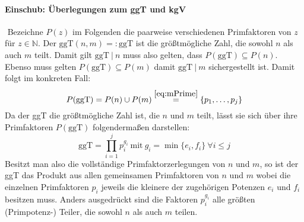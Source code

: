 \documentclass[DIN, pagenumber=false, fontsize=11pt, parskip=half]{scrartcl}
\newcommand{\N}[0]{\mathbb{N}}
\newcommand{\ggt}{\text{ggT}}
\begin{document}
\begin{enumerate}[label=\alph*)]
        \paragraph{Einschub: Überlegungen zum ggT und kgV} \label{par:Einschub} $ $ \newline
        Bezeichne $P(z)$ im Folgenden die paarweise verschiedenen Primfaktoren von $z$ für $z \in \N$. Der $\ggt(n,m) =: \ggt$ ist die größtmögliche Zahl, 
        die sowohl $n$ als auch $m$ teilt. Damit gilt $\ggt \ | \ n$ muss also gelten, dass $P(\ggt) \subseteq P(n)$. Ebenso muss gelten $P(\ggt) \subseteq P(m)$
        damit $\ggt \ | \ m$ sichergestellt ist. Damit folgt im konkreten Fall:
        \begin{equation}
            P(\ggt) = P(n) \cup P(m) \stackrel{\ref{eq:mPrime}}{=} \{p_1, \dots, p_j\} \label{eq:PggT}
        \end{equation}
        Da der ggT die größtmögliche Zahl ist, die $n$ und $m$ teilt, lässt sie sich über ihre Primfaktoren $P(\ggt)$ folgendermaßen darstellen:
        \begin{equation}
            \ggt = \prod_{i=1}^j{p_i^{g_i}} \ \text{mit} \ g_i = \min\{e_i, f_i\} \ \forall i \leq j \label{eq:ggt}
        \end{equation}
        Besitzt man also die vollständige Primfaktorzerlegungen von $n$ und $m$, so ist der ggT das Produkt aus allen gemeinsamen Primfaktoren von $n$ und $m$
        wobei die einzelnen Primfaktoren $p_i$ jeweils die kleinere der zugehörigen Potenzen $e_i$ und $f_i$ besitzen muss. Anders ausgedrückt sind die Faktoren
        $p_i^{g_i}$ alle größten (Primpotenz-) Teiler, die sowohl $n$ als auch $m$ teilen. \newpage


\end{enumerate}
\end{document}
